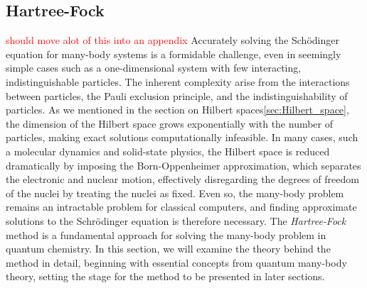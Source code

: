 \documentclass{subfiles}
\begin{document}
\subsection*{Hartree-Fock}\label{sec:HF_theory}\textcolor{red}{should move alot of this into an appendix}
Accurately solving the Schödinger equation for many-body systems is a formidable challenge, even in seemingly simple cases such as a one-dimensional system with few interacting, indistinguishable particles. The inherent complexity arise from the interactions between particles, the Pauli exclusion principle, and the indistinguishability of particles. As we mentioned in the section on Hilbert spaces\ref{sec:Hilbert_space}, the dimension of the Hilbert space grows exponentially with the number of particles, making exact solutions computationally infeasible. In many cases, such a molecular dynamics and solid-state physics, the Hilbert space is reduced dramatically by imposing the Born-Oppenheimer approximation, which separates the electronic and nuclear motion, effectively disregarding the degrees of freedom of the nuclei by treating the nuclei as fixed. Even so, the many-body problem remains an intractable problem for classical computers, and finding approximate solutions to the Schrödinger equation is therefore necessary. The \emph{Hartree-Fock} method is a fundamental approach for solving the many-body problem in quantum chemistry. In this section, we will examine the theory behind the method in detail, beginning with essential concepts from quantum many-body theory, setting the stage for the method to be presented in later sections. \\ \\
\end{document}
